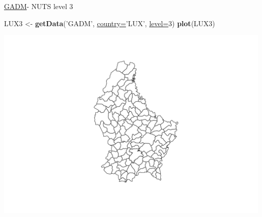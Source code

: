 \documentclass[ignorenonframetext,]{beamer}
\newenvironment{Shaded}{\begin{snugshade}}{\end{snugshade}}
\newcommand{\KeywordTok}[1]{\textcolor[rgb]{0.26,0.66,0.93}{\textbf{#1}}}
\newcommand{\DataTypeTok}[1]{\textcolor[rgb]{0.74,0.68,0.62}{\underline{#1}}}
\newcommand{\DecValTok}[1]{\textcolor[rgb]{0.27,0.67,0.26}{#1}}
\newcommand{\StringTok}[1]{\textcolor[rgb]{0.02,0.61,0.04}{#1}}
\newcommand{\NormalTok}[1]{\textcolor[rgb]{0.74,0.68,0.62}{#1}}
\begin{document}
\begin{frame}[fragile]{\href{http://www.gadm.org/}{GADM}- NUTS level 3}

\begin{Shaded}
\begin{Highlighting}[]
\NormalTok{LUX3 <-}\StringTok{ }\KeywordTok{getData}\NormalTok{(}\StringTok{'GADM'}\NormalTok{, }\DataTypeTok{country=}\StringTok{'LUX'}\NormalTok{, }\DataTypeTok{level=}\DecValTok{3}\NormalTok{)}
\KeywordTok{plot}\NormalTok{(LUX3)}
\end{Highlighting}
\end{Shaded}

\includegraphics{Geomedizin_files/figure-beamer/LUX3-1.pdf}

\end{frame}
\end{document}
